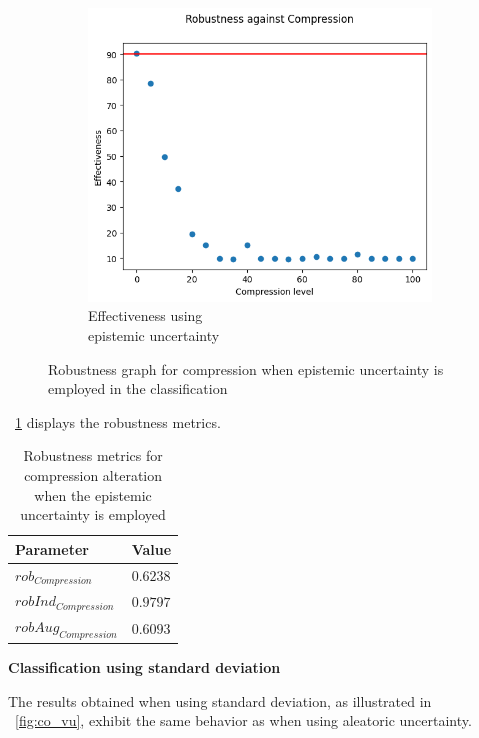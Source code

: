 \begin{figure}[h]
	\begin{subfigure}{.33\textwidth}
		\centering
		\includegraphics[width=0.9\linewidth]{ImageFiles/EvalBNN/CO/EU/eff}
		\caption{Effectiveness using \\ epistemic uncertainty}
		\label{fig:co_eu_eff}
	\end{subfigure}
	\caption{Robustness graph for compression when epistemic uncertainty is employed in the classification}
	\label{fig:co_eu}
\end{figure}

\Tab~\ref{table:rob_co_eu} displays the robustness metrics.

\begin{table}[h]
	\centering
	\begin{tabular}{|| l | l ||} 
		\hline
		\textbf{Parameter} & \textbf{Value} \\
		\hline
		\hline
		$rob_{Compression}$ & $0.6238$ \\
		$robInd_{Compression}$ & $0.9797$ \\
		$robAug_{Compression}$ & $0.6093$ \\	
		\hline
	\end{tabular}	
	\caption{Robustness metrics for compression alteration when the epistemic uncertainty is employed}
	\label{table:rob_co_eu}
\end{table}

\vspace{0.3cm}
\textbf{Classification using standard deviation}
\vspace{0.1cm}

The results obtained when using standard deviation, as illustrated in \Fig~\ref{fig:co_vu}, exhibit the same behavior as when using aleatoric uncertainty.

